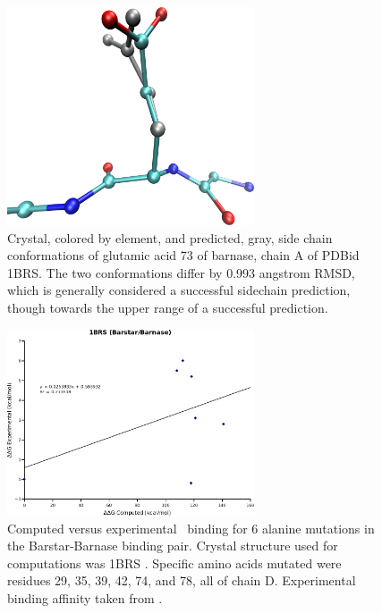 \begin{figure}[h]
    \centering
    \includegraphics[width=0.65\textwidth,height=0.3\textheight,keepaspectratio]{figures/mutation_side_chain_images/1brs_chain_a_73.png}
    \caption{Crystal, colored by element, and predicted, gray, side chain conformations of glutamic acid 73 of barnase, chain A of PDBid 1BRS.
    The two conformations differ by 0.993 angstrom RMSD, which is generally considered a successful sidechain prediction, though towards the upper range of a successful prediction.}
    \label{figure:computational_mutation_scanning/figname}
\end{figure}

\begin{figure}[h]
    \centering
    \includegraphics[width=0.65\textwidth]{figures/1brs_barstar_barnase.png}
    \caption{Computed versus experimental \ddg\ binding for 6 alanine mutations in the Barstar-Barnase binding pair.
    Crystal structure used for computations was 1BRS \protect\cite{buckle1994protein}.
    Specific amino acids mutated were residues 29, 35, 39, 42, 74, and 78, all of chain D.
    Experimental binding affinity taken from \protect\cite{thorn2001asedb}.}
    \label{figure:computational_mutation_scanning/1BRSd_ddg}
\end{figure}

